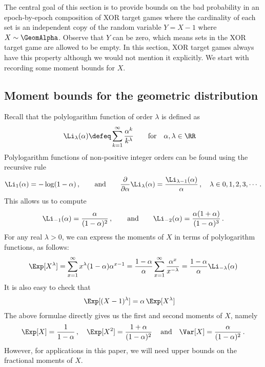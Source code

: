 The central goal of this section is to provide bounds on the bad probability 
in an epoch-by-epoch composition of XOR target games 
where the cardinality of each set is an independent copy 
of the random variable $Y = X - 1$ where $X \sim \GeomAlpha$. 
Observe that $Y$ can be zero, which means sets in the XOR target game are allowed to be empty.
In this section, XOR target games always have this property 
although we would not mention it explicitly. 
We start with recording some moment bounds for $X$.

\subsection{Moment bounds for the geometric distribution}
Recall that the polylogarithm function of order $\lambda$ is defined as
\begin{align}\label{eq:polylog}
    \Li_{\lambda}(\alpha) &\defeq \sum_{k=1}^\infty{ \frac{\alpha^k}{k^\lambda}}
\qquad \text{for}\quad \alpha, \lambda \in \RR
\end{align}
Polylogarithm functions of non-positive integer orders can be found using the recursive rule 
\[
\Li_1(\alpha) = -\log(1-\alpha)
\, , \qquad \text{and} \qquad
\dfrac{\partial}{\partial \alpha}{\Li_{\lambda}(\alpha)} = \frac{\Li_{\lambda-1}(\alpha)}{\alpha}
\, ,\quad \lambda \in 0, 1, 2, 3, \cdots
\, .
\] 
This allows us to compute
\begin{align}\label{eq:polylog-1-2}
    \Li_{-1}(\alpha) = \frac{\alpha}{(1-\alpha)^2}\, , \qquad \text{and} \qquad 
    \Li_{-2}(\alpha) = \frac{\alpha (1+\alpha)}{(1-\alpha)^3} 
    \, .
\end{align}
For any real $\lambda > 0$, we can express the moments of $X$ in terms of polylogarithm functions, as follows:
\begin{align}\label{eq:geom-moment}
\Exp[X^\lambda]
= \sum_{x=1}^\infty{  x^\lambda (1-\alpha) \alpha^{x-1} } 
= \frac{1-\alpha}{\alpha} \sum_{x=1}^\infty{ \frac{\alpha^{x}}{x^{-\lambda} } } 
= \frac{1-\alpha}{\alpha}\Li_{-\lambda}(\alpha)
\end{align}
It is also easy to check that 
\begin{align}\label{eq:geom-moment-x-minus-one}
\Exp[(X-1)^\lambda]
&= \alpha\,\Exp[X^\lambda]
\end{align}
The above formulae directly gives us the first and second moments of $X$, namely
\begin{align}\label{eq:geom-moments-1-2}
\Exp [X] = \frac{1}{1-\alpha}
\, , \quad 
\Exp[X^2] 
= \frac{1 + \alpha}{(1-\alpha)^2} 
\, \quad \text{and}\quad
\Var[X] = \frac{\alpha}{(1-\alpha)^2}
\, .
\end{align}
However, for applications in this paper, we will need upper bounds on 
the fractional moments of $X$. 

